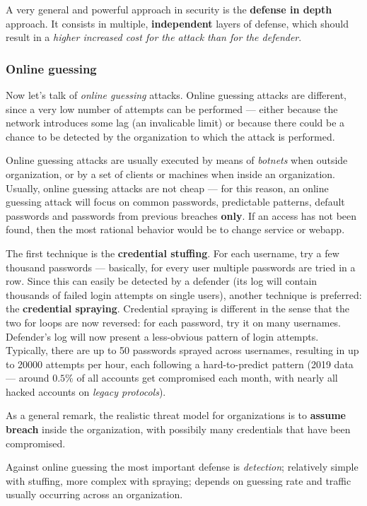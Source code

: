 \documentclass[10pt]{\classname}
\begin{document}
A very general and powerful approach in security is the \textbf{defense in
depth} approach. It consists in multiple, \textbf{independent} layers of
defense, which should result in a \emph{higher increased cost for the attack
than for the defender}.


\subsubsection{Online guessing}
Now let's talk of \emph{online guessing} attacks. Online guessing attacks are
different, since a very low number of attempts can be performed --- either
because the network introduces some lag (an invalicable limit) or because there
could be a chance to be detected by the organization to which the attack is
performed.

Online guessing attacks are usually executed by means of \emph{botnets} when
outside organization, or by a set of clients or machines when inside an
organization. Usually, online guessing attacks are not cheap --- for this
reason, an online guessing attack will focus on common passwords, predictable
patterns, default passwords and passwords from previous breaches \textbf{only}.
If an access has not been found, then the most rational behavior would be to
change service or webapp.

The first technique is the \textbf{credential stuffing}. For each username, try
a few thousand passwords --- basically, for every user multiple passwords are
tried in a row. Since this can easily be detected by a defender (its log will
contain thousands of failed login attempts on single users), another technique
is preferred: the \textbf{credential spraying}. Credential spraying is
different in the sense that the two for loops are now reversed: for each
password, try it on many usernames. Defender's log will now present a
less\--obvious pattern of login attempts. Typically, there are up to 50
passwords sprayed across usernames, resulting in up to 20000 attempts per hour,
each following a hard-to-predict pattern (2019 data --- around $0.5\%$ of all
accounts get compromised each month, with nearly all hacked accounts on
\emph{legacy protocols}).

As a general remark, the realistic threat model for organizations is to
\textbf{assume breach} inside the organization, with possibily many credentials
that have been compromised.

Against online guessing the most important defense is \emph{detection};
relatively simple with stuffing, more complex with spraying; depends on
guessing rate and traffic usually occurring across an organization.
\end{document}
